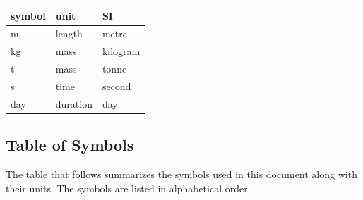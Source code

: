 \documentclass[12pt]{article}
\begin{document}
\renewcommand{\arraystretch}{1.2}
  \noindent \begin{tabular}{l l l} 
    \toprule		
    \textbf{symbol} & \textbf{unit} & \textbf{SI}\\
    \midrule 

    \si{\metre} & length & metre \\
    \si{\kilogram} & mass & kilogram \\
    \si{t} & mass & tonne\\
    \si{\second} & time & second \\
    \si{day} & duration & day \\

    \bottomrule
  \end{tabular}

\subsection{Table of Symbols}

The table that follows summarizes the symbols used in this document along with
their units. The symbols are listed in alphabetical order.

\break
\break
\end{document}
